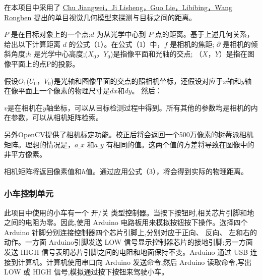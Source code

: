 \documentclass[UTF8,a4paper,cs4size]{ctexart}
\begin{document}
在本项目中采用了 \href{http://urlc.cn/gWN7Y4}{
Chu Jiangwei，Ji Lisheng，Guo Lie，Libibing，Wang Rongben} 提出的单目视觉几何模型来探测与目标之间的距离。

$P$ 是在目标对象上的一个点;$d$ 为从光学中心到 $P$ 点的距离。基于上述几何关系，给出以下计算距离 $d$ 的公式（1）。在公式（1）中，$f$ 是相机的焦距; $\partial$ 是相机的倾斜角度;$h$ 是光学中心高度;($X_0$，$Y_0$)是指像平面和光轴的交点;
（$X$，$Y$）是指在图像平面上的点P的投影。

假设$O_1$($U_0$，$V_0$)是光轴和图像平面的交点的照相机坐标，还假设对应于$x$轴和$y$轴在像平面上一个像素的物理尺寸是$dx$和$dy$。
然后：

$v$是在相机在$y$轴坐标，可以从目标检测过程中得到。所有其他的参数均是相机的内在参数，可以从相机矩阵检索。

另外OpenCV提供了\href{http://opencv-python-tutroals.readthedocs.io/en/latest/py_tutorials/py_calib3d/py_calibration/py_calibration.html}{相机标定}功能。校正后将会返回一个500万像素的树莓派相机矩阵。理想的情况是，$a\_x$ 和$a\_y$ 有相同的值。这两个值的方差将导致在图像中的非平方像素。

相机矩阵将返回像素值和$h$值。通过应用公式（3），将会得到实际的物理距离。

\subsubsection*{小车控制单元}
此项目中使用的小车有一个 开/关 类型控制器。当按下按钮时,相关芯片引脚和地之间的电阻为零。因此,使用 Arduino 电路板用来模拟按钮按下操作。选择四个 Arduino 针脚分别连接控制器四个芯片引脚上,分别对应于正向、 反向、 左和右的动作。一方面 Arduino引脚发送 LOW 信号显示控制器芯片的接地引脚;另一方面发送 HIGH 信号表明芯片引脚之间的电阻和地面保持不变。Arduino 通过 USB 连接到计算机。计算机使用串口向 Arduino 发送命令,然后 Arduino 读取命令,写出 LOW 或 HIGH 信号,模拟通过按下按钮来驾驶小车。
\end{document}
